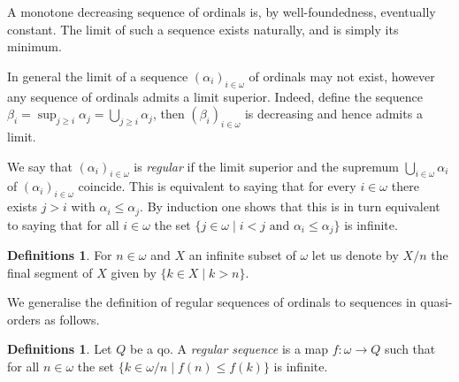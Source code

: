 \documentclass{article}%
\theoremstyle{plain}
\theoremstyle{definition}
\newtheorem{definition}[theorem]{Definition}
\newtheorem{definition}[theorem]{Notation}
\newtheorem{definition}[theorem]{Notations}
\newtheorem{definition}[theorem]{Definitions}
\theoremstyle{remark}
\begin{document}
A monotone decreasing sequence of ordinals is, by well-foundedness, eventually constant. The limit of such a sequence exists naturally, and is simply its minimum.

In general the limit of a sequence $(\alpha_i)_{i\in\omega}$ of ordinals may not exist, however any sequence of ordinals admits a limit superior. Indeed, define the sequence $\beta_i=\sup_{j\geq i}\alpha_j=\bigcup_{j\geq i} \alpha_{j}$, then $(\beta_i)_{i\in\omega}$ is decreasing and hence admits a limit.


We say that $(\alpha_i)_{i\in\omega}$ is \emph{regular} if the limit superior and the supremum $\bigcup_{i\in \omega}\alpha_{i}$ of $(\alpha_i)_{i\in\omega}$ coincide. This is equivalent to saying that for every $i\in \omega$ there exists $j>i$ with $\alpha_{i}\leq \alpha_{j}$. By induction one shows that this is in turn equivalent to saying that for all $i\in\omega$ the set $\{j\in\omega\mid i<j\text{ and } \alpha_{i}\leq\alpha_{j}\}$ is infinite.

\begin{definition}
For $n\in \omega$ and $X$ an infinite subset of $\omega$ let us denote by $X/n$ the final segment of $X$ given by $\{k\in X\mid k>n\}$. 
\end{definition}


We generalise the definition of regular sequences of ordinals to sequences in quasi-orders as follows.

\begin{definition}
Let $Q$ be a qo. A \emph{regular sequence} is a map $f:\omega\to Q$ such that for all $n\in \omega$ the set $\{k\in\omega/n\mid f(n)\leq f(k)\}$ is infinite.
\end{definition}
\end{document}
